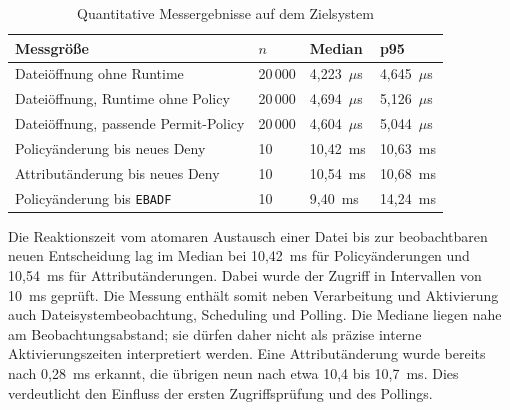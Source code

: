 \begin{table}[htbp]
    \centering
    \begin{tabular}{p{}p{}p{}p{}}
        \hline
        \textbf{Messgröße} & \textbf{$n$} & \textbf{Median} & \textbf{p95} \\
        \hline
        Dateiöffnung ohne Runtime & 20\,000 & 4,223~$\mu$s & 4,645~$\mu$s \\
        Dateiöffnung, Runtime ohne Policy & 20\,000 & 4,694~$\mu$s & 5,126~$\mu$s \\
        Dateiöffnung, passende Permit-Policy & 20\,000 & 4,604~$\mu$s & 5,044~$\mu$s \\
        Policyänderung bis neues Deny & 10 & 10,42~ms & 10,63~ms \\
        Attributänderung bis neues Deny & 10 & 10,54~ms & 10,68~ms \\
        Policyänderung bis \texttt{EBADF} & 10 & 9,40~ms & 14,24~ms \\
        \hline
    \end{tabular}
    \caption{Quantitative Messergebnisse auf dem Zielsystem}
    \label{tab:performance-ergebnisse}
\end{table}

Die Reaktionszeit vom atomaren Austausch einer Datei bis zur beobachtbaren neuen Entscheidung
lag im Median bei 10,42~ms für Policyänderungen und 10,54~ms für Attributänderungen. Dabei wurde
der Zugriff in Intervallen von 10~ms geprüft. Die Messung enthält somit neben Verarbeitung und
Aktivierung auch Dateisystembeobachtung, Scheduling und Polling. Die Mediane liegen nahe
am Beobachtungsabstand; sie dürfen daher nicht als präzise interne Aktivierungszeiten interpretiert
werden. Eine Attributänderung wurde bereits nach 0,28~ms erkannt, die übrigen neun nach etwa
10,4 bis 10,7~ms. Dies verdeutlicht den Einfluss der ersten Zugriffsprüfung und des Pollings.

